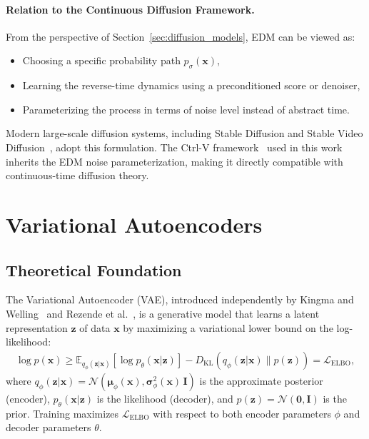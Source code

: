 \paragraph{Relation to the Continuous Diffusion Framework.}
From the perspective of Section~\ref{sec:diffusion_models}, EDM can be viewed as:
\begin{itemize}
    \item Choosing a specific probability path $p_\sigma(\mathbf{x})$,
    \item Learning the reverse-time dynamics using a preconditioned score or denoiser,
    \item Parameterizing the process in terms of noise level instead of abstract time.
\end{itemize}

Modern large-scale diffusion systems, including Stable Diffusion and Stable Video Diffusion~\cite{blattmann2023stable}, adopt this formulation. The Ctrl-V framework~\cite{luo2025ctrlv} used in this work inherits the EDM noise parameterization, making it directly compatible with continuous-time diffusion theory.

\section{Variational Autoencoders}
\label{sec:vae}

\subsection{Theoretical Foundation}
\label{subsec:vae_theory}

The Variational Autoencoder (VAE), introduced independently by Kingma and Welling~\cite{kingma2014autoencoding} and Rezende et al.~\cite{rezende2014stochastic}, is a generative model that learns a latent representation $\mathbf{z}$ of data $\mathbf{x}$ by maximizing a variational lower bound on the log-likelihood:
\begin{align}
    \log p(\mathbf{x}) \geq \mathbb{E}_{q_\phi(\mathbf{z}|\mathbf{x})}\!\left[\log p_\theta(\mathbf{x}|\mathbf{z})\right] - D_{\text{KL}}\!\left(q_\phi(\mathbf{z}|\mathbf{x}) \| p(\mathbf{z})\right) = \mathcal{L}_{\text{ELBO}},
    \label{eq:elbo}
\end{align}
where $q_\phi(\mathbf{z}|\mathbf{x}) = \mathcal{N}(\boldsymbol{\mu}_\phi(\mathbf{x}), \boldsymbol{\sigma}_\phi^2(\mathbf{x})\,\mathbf{I})$ is the approximate posterior (encoder), $p_\theta(\mathbf{x}|\mathbf{z})$ is the likelihood (decoder), and $p(\mathbf{z}) = \mathcal{N}(\mathbf{0}, \mathbf{I})$ is the prior. Training maximizes $\mathcal{L}_{\text{ELBO}}$ with respect to both encoder parameters $\phi$ and decoder parameters $\theta$.

